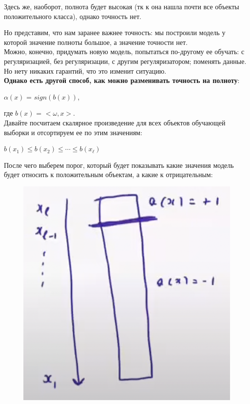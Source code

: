             Здесь же, наоборот, полнота будет высокая (тк к она нашла почти все объекты положительного класса), однако точность нет.\\



            Но представим, что нам заранее важнее точность: мы построили модель у которой значение полноты большое, а значение точности нет. \\

            Можно, конечно, придумать новую модель, попытаться по-другому ее обучать: с регуляризацией, без регуляризации, с другим регуляризатором; поменять данные. Но нету никаких гарантий, что это изменит ситуацию.\\

            \textbf{Однако есть другой способ, как можно разменивать точность на полноту}:

            \begin{center}
                $\alpha(x)$ = $sign(b(x))$,
            \end{center}
            где $b(x)$ = $<\omega, x>$.\\

            Давайте посчитаем скалярное произведение для всех объектов обучающей выборки и отсортируем ее по этим значениям:
            
            \begin{center}
                $b(x_1) \leq b(x_2) \leq \cdots \leq b(x_\ell)$ 
            \end{center}

            После чего выберем порог, который будет показывать какие значения модель будет относить к положительным объектам, а какие к отрицательным:
            \begin{figure}[H]
                \centering
                \includegraphics[width=0.3 \textwidth]{images/5lecture/sorted_object_set.png}
            \end{figure}

